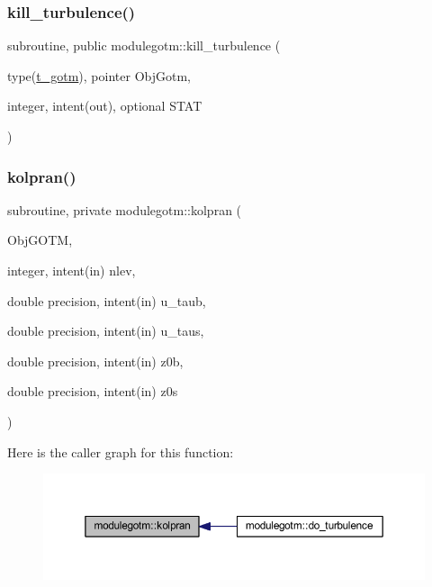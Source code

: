 \subsubsection{\texorpdfstring{kill\+\_\+turbulence()}{kill\_turbulence()}}
{\footnotesize\ttfamily subroutine, public modulegotm\+::kill\+\_\+turbulence (\begin{DoxyParamCaption}\item[{type(\mbox{\hyperlink{structmodulegotm_1_1t__gotm}{t\+\_\+gotm}}), pointer}]{Obj\+Gotm,  }\item[{integer, intent(out), optional}]{S\+T\+AT }\end{DoxyParamCaption})}

\mbox{\label{namespacemodulegotm_a41a284016e83d9fe85740b08ed8abdc2}} 
\subsubsection{\texorpdfstring{kolpran()}{kolpran()}}
{\footnotesize\ttfamily subroutine, private modulegotm\+::kolpran (\begin{DoxyParamCaption}\item[{}]{Obj\+G\+O\+TM,  }\item[{integer, intent(in)}]{nlev,  }\item[{double precision, intent(in)}]{u\+\_\+taub,  }\item[{double precision, intent(in)}]{u\+\_\+taus,  }\item[{double precision, intent(in)}]{z0b,  }\item[{double precision, intent(in)}]{z0s }\end{DoxyParamCaption})\hspace{0.3cm}{\ttfamily [private]}}

Here is the caller graph for this function\+:\nopagebreak
\begin{figure}[H]
\begin{center}
\leavevmode
\includegraphics[width=350pt]{namespacemodulegotm_a41a284016e83d9fe85740b08ed8abdc2_icgraph}
\end{center}
\end{figure}
\mbox{\label{namespacemodulegotm_a2d9e32d408a390b64575234c5dd95f62}} 
